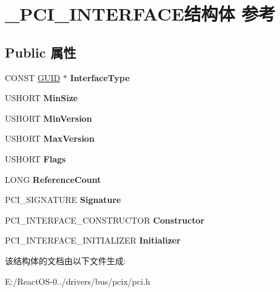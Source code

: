\hypertarget{struct___p_c_i___i_n_t_e_r_f_a_c_e}{}\section{\+\_\+\+P\+C\+I\+\_\+\+I\+N\+T\+E\+R\+F\+A\+C\+E结构体 参考}
\label{struct___p_c_i___i_n_t_e_r_f_a_c_e}
\subsection*{Public 属性}
\begin{DoxyCompactItemize}
\item 
\mbox{\label{struct___p_c_i___i_n_t_e_r_f_a_c_e_aefaf6208ac29296233b7d5c596df4d30}} 
C\+O\+N\+ST \hyperlink{interface_g_u_i_d}{G\+U\+ID} $\ast$ {\bfseries Interface\+Type}
\item 
\mbox{\label{struct___p_c_i___i_n_t_e_r_f_a_c_e_a2680172372492639888ee8b08b0d3ca5}} 
U\+S\+H\+O\+RT {\bfseries Min\+Size}
\item 
\mbox{\label{struct___p_c_i___i_n_t_e_r_f_a_c_e_aeb6c655b138ccade1c4a18fe8dc46211}} 
U\+S\+H\+O\+RT {\bfseries Min\+Version}
\item 
\mbox{\label{struct___p_c_i___i_n_t_e_r_f_a_c_e_a8a062d9f5706c07d86ac73144032cb37}} 
U\+S\+H\+O\+RT {\bfseries Max\+Version}
\item 
\mbox{\label{struct___p_c_i___i_n_t_e_r_f_a_c_e_a594b1969d17dc9f706e74d18b7a001a7}} 
U\+S\+H\+O\+RT {\bfseries Flags}
\item 
\mbox{\label{struct___p_c_i___i_n_t_e_r_f_a_c_e_a8684f4d3683f47c810c2f5dceb6ec5c8}} 
L\+O\+NG {\bfseries Reference\+Count}
\item 
\mbox{\label{struct___p_c_i___i_n_t_e_r_f_a_c_e_aa3d7dd3519b87a16d1b8591a4a0fb7c1}} 
P\+C\+I\+\_\+\+S\+I\+G\+N\+A\+T\+U\+RE {\bfseries Signature}
\item 
\mbox{\label{struct___p_c_i___i_n_t_e_r_f_a_c_e_a8bcce0380bf1d2d5a1b236c047690273}} 
P\+C\+I\+\_\+\+I\+N\+T\+E\+R\+F\+A\+C\+E\+\_\+\+C\+O\+N\+S\+T\+R\+U\+C\+T\+OR {\bfseries Constructor}
\item 
\mbox{\label{struct___p_c_i___i_n_t_e_r_f_a_c_e_ad979869a177abd8c0dc78db7b45989bc}} 
P\+C\+I\+\_\+\+I\+N\+T\+E\+R\+F\+A\+C\+E\+\_\+\+I\+N\+I\+T\+I\+A\+L\+I\+Z\+ER {\bfseries Initializer}
\end{DoxyCompactItemize}


该结构体的文档由以下文件生成\+:\begin{DoxyCompactItemize}
\item 
E\+:/\+React\+O\+S-\/0../drivers/bus/pcix/pci.\+h\end{DoxyCompactItemize}
